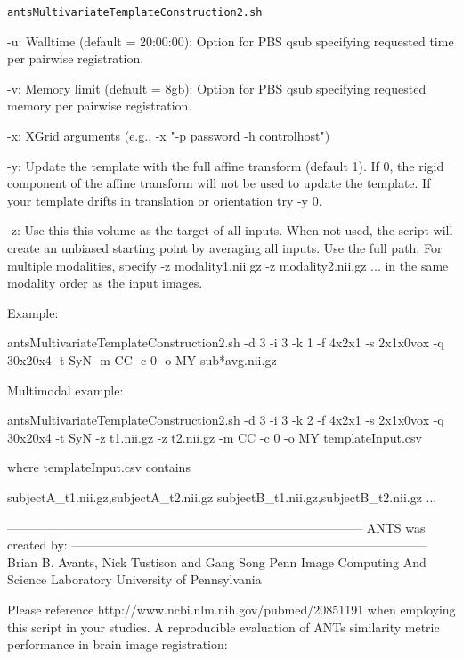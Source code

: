 \documentclass[ignorenonframetext,]{beamer}
\newenvironment{Shaded}{\begin{snugshade}}{\end{snugshade}}
\newcommand{\StringTok}[1]{\textcolor[rgb]{0.31,0.60,0.02}{{#1}}}
\begin{document}
\begin{frame}[fragile]{\texttt{antsMultivariateTemplateConstruction2.sh}}
\begin{Shaded}
\begin{Highlighting}[]
\StringTok{     -u:  Walltime (default = 20:00:00):  Option for PBS qsub specifying requested time}
\StringTok{          per pairwise registration.}

\StringTok{     -v:  Memory limit (default = 8gb):  Option for PBS qsub specifying requested memory}
\StringTok{          per pairwise registration.}

\StringTok{     -x:  XGrid arguments (e.g., -x "-p password -h controlhost")}

\StringTok{     -y:  Update the template with the full affine transform (default 1). If 0, the rigid}
\StringTok{          component of the affine transform will not be used to update the template. If your}
\StringTok{          template drifts in translation or orientation try -y 0.}

\StringTok{     -z:  Use this this volume as the target of all inputs. When not used, the script}
\StringTok{          will create an unbiased starting point by averaging all inputs. Use the full}
\StringTok{          path.}
\StringTok{          For multiple modalities, specify -z modality1.nii.gz -z modality2.nii.gz ...}
\StringTok{          in the same modality order as the input images.}

\StringTok{Example:}

\StringTok{antsMultivariateTemplateConstruction2.sh -d 3 -i 3 -k 1 -f 4x2x1 -s 2x1x0vox -q 30x20x4 -t SyN  -m CC -c 0 -o MY sub*avg.nii.gz}

\StringTok{Multimodal example:}

\StringTok{antsMultivariateTemplateConstruction2.sh -d 3 -i 3 -k 2 -f 4x2x1 -s 2x1x0vox -q 30x20x4 -t SyN -z t1.nii.gz -z t2.nii.gz  -m CC -c 0 -o MY templateInput.csv}

\StringTok{where templateInput.csv contains}

\StringTok{subjectA_t1.nii.gz,subjectA_t2.nii.gz}
\StringTok{subjectB_t1.nii.gz,subjectB_t2.nii.gz}
\StringTok{...}

\StringTok{--------------------------------------------------------------------------------------}
\StringTok{ANTS was created by:}
\StringTok{--------------------------------------------------------------------------------------}
\StringTok{Brian B. Avants, Nick Tustison and Gang Song}
\StringTok{Penn Image Computing And Science Laboratory}
\StringTok{University of Pennsylvania}

\StringTok{Please reference http://www.ncbi.nlm.nih.gov/pubmed/20851191 when employing this script}
\StringTok{in your studies. A reproducible evaluation of ANTs similarity metric performance in}
\StringTok{brain image registration:}


\end{Highlighting}
\end{Shaded}
\end{frame}
\end{document}
